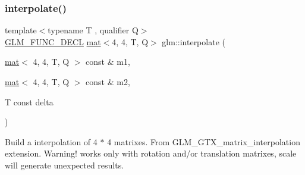 \subsubsection{\texorpdfstring{interpolate()}{interpolate()}}
{\footnotesize\ttfamily template$<$typename T , qualifier Q$>$ \\
\mbox{\hyperlink{setup_8hpp_ab2d052de21a70539923e9bcbf6e83a51}{G\+L\+M\+\_\+\+F\+U\+N\+C\+\_\+\+D\+E\+CL}} \mbox{\hyperlink{structglm_1_1mat}{mat}}$<$4, 4, T, Q$>$ glm\+::interpolate (\begin{DoxyParamCaption}\item[{\mbox{\hyperlink{structglm_1_1mat}{mat}}$<$ 4, 4, T, Q $>$ const \&}]{m1,  }\item[{\mbox{\hyperlink{structglm_1_1mat}{mat}}$<$ 4, 4, T, Q $>$ const \&}]{m2,  }\item[{T const}]{delta }\end{DoxyParamCaption})}

Build a interpolation of 4 $\ast$ 4 matrixes. From G\+L\+M\+\_\+\+G\+T\+X\+\_\+matrix\+\_\+interpolation extension. Warning! works only with rotation and/or translation matrixes, scale will generate unexpected results. 